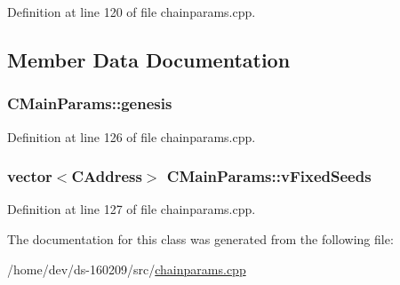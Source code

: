 Definition at line 120 of file chainparams.\+cpp.



\subsection{Member Data Documentation}
\hypertarget{class_c_main_params_a820a707a8769ce6b71bb61cfc6982fa5}{}
\subsubsection[{genesis}]{ C\+Main\+Params\+::genesis\hspace{0.3cm}{\ttfamily [protected]}}\label{class_c_main_params_a820a707a8769ce6b71bb61cfc6982fa5}


Definition at line 126 of file chainparams.\+cpp.

\hypertarget{class_c_main_params_a25f9a0aabc628c122817c1358da75c33}{}
\subsubsection[{v\+Fixed\+Seeds}]{\setlength{\rightskip}{0pt plus 5cm}vector$<${\bf C\+Address}$>$ C\+Main\+Params\+::v\+Fixed\+Seeds\hspace{0.3cm}{\ttfamily [protected]}}\label{class_c_main_params_a25f9a0aabc628c122817c1358da75c33}


Definition at line 127 of file chainparams.\+cpp.



The documentation for this class was generated from the following file\+:\begin{DoxyCompactItemize}
\item 
/home/dev/ds-\/160209/src/\hyperlink{chainparams_8cpp}{chainparams.\+cpp}\end{DoxyCompactItemize}
